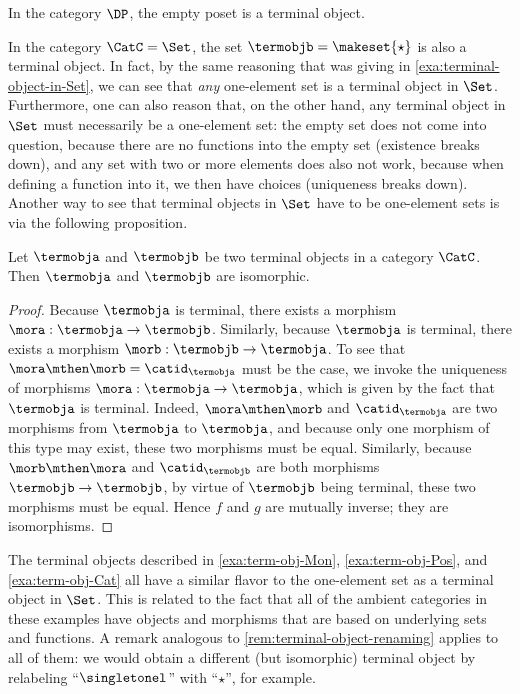 \begin{example}\label{exa:term-obj-DP}
In the category $\DP$, the empty poset is a terminal object.
\end{example}

\begin{remark}\label{rem:terminal-object-renaming}
In the category $\CatC = \Set$, the set $\termobjb = \makeset{ \star}$ is also a terminal object. In fact, by the same reasoning that was giving in \cref{exa:terminal-object-in-Set}, we can see that \emph{any} one-element set is a terminal object in $\Set$. Furthermore, one can also reason that, on the other hand, any terminal object in $\Set$ must necessarily be a one-element set: the empty set does not come into question, because there are no functions into the empty set (existence breaks down), and any set with two or more elements does also not work, because when defining a function into it, we then have choices (uniqueness breaks down). Another way to see that terminal objects in $\Set$ have to be one-element sets is via the following proposition. 
\end{remark}

\begin{proposition}\label{prop:terminal-objs-isom}
Let $\termobja$ and $\termobjb$ be two terminal objects in a category $\CatC$.  Then $\termobja$ and $\termobjb$ are isomorphic.  
\end{proposition}

\begin{proof}
Because $\termobja$ is terminal, there exists a morphism $\mora : \termobja \to \termobjb$. Similarly, because $\termobja$ is terminal, there exists a morphism $\morb : \termobjb \to \termobja$. To see that $\mora \mthen \morb = \catid_\termobja$ must be the case, we invoke the uniqueness of morphisms $\mora : \termobja \to \termobja$, which is given by the fact that $\termobja$ is terminal. Indeed, $\mora \mthen \morb$ and $\catid_\termobja$ are two morphisms from $\termobja$ to $\termobja$, and because only one morphism of this type may exist, these two morphisms must be equal. Similarly, because $\morb \mthen \mora$ and $\catid_\termobjb$ are both morphisms $\termobjb \to \termobjb$, by virtue of $\termobjb$ being terminal, these two morphisms must be equal. Hence $f$ and $g$ are mutually inverse; they are isomorphisms. 
\end{proof}

\begin{remark}
The terminal objects described in \cref{exa:term-obj-Mon}, \cref{exa:term-obj-Pos}, and \cref{exa:term-obj-Cat} all have a similar flavor to the one-element set as a terminal object in $\Set$. This is related to the fact that all of the ambient categories in these examples have objects and morphisms that are based on underlying sets and functions. A remark analogous to \cref{rem:terminal-object-renaming} applies to all of them: we would obtain a different (but isomorphic) terminal object by relabeling ``$\singletonel$'' with ``$\star$'', for example. 
\end{remark}

